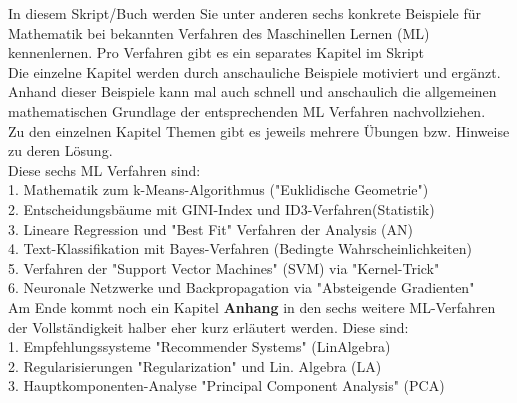 \documentclass[12pt]{article}
\begin{document}
In diesem Skript/Buch werden Sie unter anderen sechs konkrete Beispiele für Mathematik bei bekannten Verfahren des Maschinellen Lernen (ML) kennenlernen. Pro Verfahren gibt es ein separates Kapitel im Skript\\
Die einzelne Kapitel werden durch anschauliche Beispiele motiviert und  ergänzt. Anhand dieser Beispiele kann mal auch schnell und anschaulich die allgemeinen mathematischen Grundlage der entsprechenden ML Verfahren nachvollziehen.\\
Zu den einzelnen Kapitel Themen gibt es jeweils mehrere Übungen bzw. Hinweise zu deren Lösung.\\
Diese sechs ML Verfahren sind:\\


1. Mathematik zum k-Means-Algorithmus ("Euklidische Geometrie")\\

2. Entscheidungsbäume mit GINI-Index und ID3-Verfahren(Statistik)\\

3. Lineare Regression und "Best Fit" Verfahren der Analysis (AN)\\

4. Text-Klassifikation mit Bayes-Verfahren (Bedingte Wahrscheinlichkeiten)\\
 
5. Verfahren der "Support Vector Machines" (SVM) via "Kernel-Trick"\\

6. Neuronale Netzwerke und Backpropagation via "Absteigende Gradienten"\\[0.2cm]
%
Am Ende kommt noch ein Kapitel \textbf{Anhang} in den sechs weitere ML-Verfahren der Vollständigkeit halber eher kurz erläutert werden. Diese sind:\\

1. Empfehlungssysteme "Recommender Systems" (LinAlgebra)\\

2. Regularisierungen "Regularization" und Lin. Algebra (LA)\\

3. Hauptkomponenten-Analyse "Principal Component Analysis" (PCA)\\
 
\end{document}
